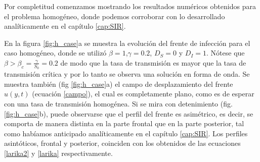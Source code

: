 \vspace*{-.7cm}

Por completitud comenzamos mostrando los resultados numéricos obtenidos para el problema homogéneo, donde podemos corroborar con lo desarrollado analíticamente
en el capítulo \ref{cap:SIR}.

En la figura \ref{fig:h_case}a se muestra la evolución del frente de infección para el caso homogéneo, donde se utilizó $\beta=1$,$\gamma=0.2$, $D_S=0$ y $D_I=1$.
Nótese que $\beta > \beta_c = \frac{\gamma}{S_0} = 0.2$ de modo que la tasa de transmisión es mayor que la tasa de transmisión crítica y por lo tanto se observa una solución en forma de onda. Se muestra también (fig \ref{fig:h_case}a) el campo de desplazamiento del frente $u(y,t)$ (ecuación \ref{campo}), el cual es completamente plano, como es de esperar con una tasa de transmisión homogénea. Si se mira con detenimiento (fig. \ref{fig:h_case}b), puede observarse que el perfil del frente es asimétrico, es decir, se comporta de manera distinta en la parte frontal que en la parte posterior, tal como habíamos anticipado analíticamente en el capítulo \ref{cap:SIR}. Los perfiles asintóticos, frontal y posterior, coinciden con los obtenidos de las ecuaciones \ref{larika2} y \ref{larika} respectivamente.

